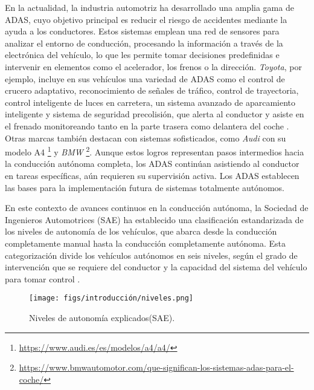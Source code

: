 En la actualidad, la industria automotriz ha desarrollado una amplia gama de \ac{ADAS}, cuyo objetivo principal es reducir el riesgo de accidentes mediante la ayuda a los conductores. Estos sistemas emplean una red de sensores para analizar el entorno de conducción, procesando la información a través de la electrónica del vehículo, lo que les permite tomar decisiones predefinidas e intervenir en elementos como el acelerador, los frenos o la dirección. \textit{Toyota}, por ejemplo, incluye en sus vehículos una variedad de \ac{ADAS} como el control de crucero adaptativo, reconocimiento de señales de tráfico, control de trayectoria, control inteligente de luces en carretera, un sistema avanzado de aparcamiento inteligente y sistema de seguridad precolisión, que alerta al conductor y asiste en el frenado monitoreando tanto en la parte trasera como delantera del coche \cite{toyota-assist}. Otras marcas también destacan con sistemas sofisticados, como \textit{Audi} con su modelo A4 \footnote{\url{https://www.audi.es/es/modelos/a4/a4/}} y \textit{BMW} \footnote{\url{https://www.bmwautomotor.com/que-significan-los-sistemas-adas-para-el-coche/}}. Aunque estos logros representan pasos intermedios hacia la conducción autónoma completa, los \ac{ADAS} continúan asistiendo al conductor en tareas específicas, aún requieren su supervisión activa. Los \ac{ADAS} establecen las bases para la implementación futura de sistemas totalmente autónomos. 

En este contexto de avances continuos en la conducción autónoma, la Sociedad de Ingenieros Automotrices (\ac{SAE}) ha establecido una clasificación estandarizada de los niveles de autonomía de los vehículos, que abarca desde la conducción completamente manual hasta la conducción completamente autónoma. Esta categorización divide los vehículos autónomos en seis niveles, según el grado de intervención que se requiere del conductor y la capacidad del sistema del vehículo para tomar control \cite{autobild-autonomous}.

\newpage

\begin{figure} [ht]
  \begin{center}
    \texttt{[image: figs/introducción/niveles.png]}
  \end{center}
  \caption{Niveles de autonomía explicados(\ac{SAE}).}
  \label{aut-levels}
  \end{figure}

